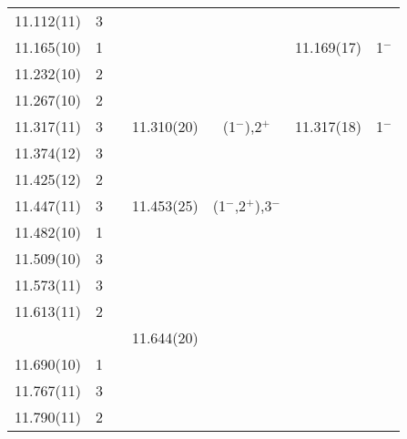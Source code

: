 \begin{center}
\begin{longtable}{cc c cc cc}
  11.112(11)    &   3   &                   &                   &                   &                   &                   \\
 11.165(10)     &   1   &                   &                   &                   &   11.169(17)      &       1$^-$       \\
 11.232(10)     &   2   &                   &                   &                   &                   &                   \\
 11.267(10)     &   2   &                   &                   &                   &                   &                   \\
 11.317(11)     &   3   &                   &     11.310(20)    &  (1$^-$),2$^+$    &   11.317(18)      &       1$^-$       \\
 11.374(12)     &   3   &                   &                   &                   &                   &                   \\
 11.425(12)     &   2   &                   &                   &                   &                   &                   \\
 11.447(11)     &   3   &                   &     11.453(25)    &(1$^-$,2$^+$),3$^-$&                   &                   \\
 11.482(10)     &   1   &                   &                   &                   &                   &                   \\
 11.509(10)     &   3   &                   &                   &                   &                   &                   \\
  11.573(11)    &   3   &                   &                   &                   &                   &                   \\
  11.613(11)    &   2   &                   &                   &                   &                   &                   \\
                &       &                   &     11.644(20)    &                   &                   &                   \\
   11.690(10)   &   1   &                   &                   &                   &                   &                   \\
   11.767(11)   &   3   &                   &                   &                   &                   &                   \\
   11.790(11)   &   2   &                   &                   &                   &                   &                   \\

\end{longtable}
\end{center}
